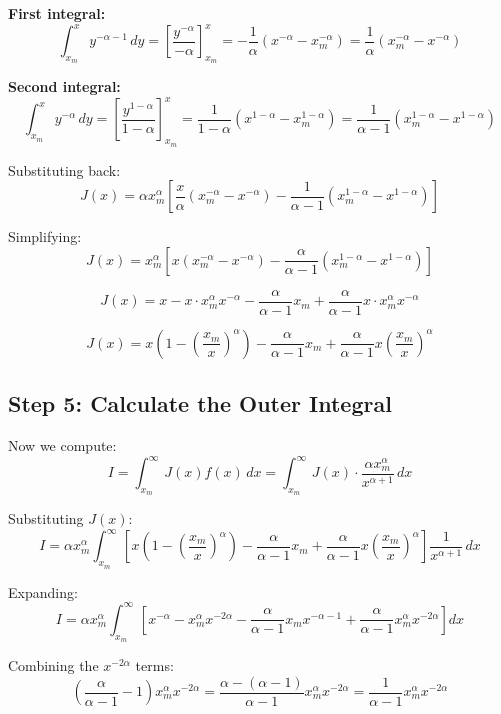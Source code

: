 \documentclass[12pt,a4paper]{article}
\theoremstyle{definition}
\begin{document}
\textbf{First integral:}
\[
\int_{x_m}^x y^{-\alpha-1} \, dy = \left[ \frac{y^{-\alpha}}{-\alpha} \right]_{x_m}^x = -\frac{1}{\alpha}\left(x^{-\alpha} - x_m^{-\alpha}\right) = \frac{1}{\alpha}\left(x_m^{-\alpha} - x^{-\alpha}\right)
\]

\textbf{Second integral:}
\[
\int_{x_m}^x y^{-\alpha} \, dy = \left[ \frac{y^{1-\alpha}}{1-\alpha} \right]_{x_m}^x = \frac{1}{1-\alpha}\left(x^{1-\alpha} - x_m^{1-\alpha}\right) = \frac{1}{\alpha - 1}\left(x_m^{1-\alpha} - x^{1-\alpha}\right)
\]

Substituting back:
\[
J(x) = \alpha x_m^\alpha \left[ \frac{x}{\alpha}\left(x_m^{-\alpha} - x^{-\alpha}\right) - \frac{1}{\alpha - 1}\left(x_m^{1-\alpha} - x^{1-\alpha}\right) \right]
\]

Simplifying:
\[
J(x) = x_m^\alpha \left[ x\left(x_m^{-\alpha} - x^{-\alpha}\right) - \frac{\alpha}{\alpha - 1}\left(x_m^{1-\alpha} - x^{1-\alpha}\right) \right]
\]

\[
J(x) = x - x \cdot x_m^\alpha x^{-\alpha} - \frac{\alpha}{\alpha - 1} x_m + \frac{\alpha}{\alpha - 1} x \cdot x_m^\alpha x^{-\alpha}
\]

\[
J(x) = x\left(1 - \left(\frac{x_m}{x}\right)^\alpha\right) - \frac{\alpha}{\alpha - 1} x_m + \frac{\alpha}{\alpha - 1} x\left(\frac{x_m}{x}\right)^\alpha
\]

\subsection{Step 5: Calculate the Outer Integral}

Now we compute:
\[
I = \int_{x_m}^\infty J(x) f(x) \, dx = \int_{x_m}^\infty J(x) \cdot \frac{\alpha x_m^\alpha}{x^{\alpha+1}} \, dx
\]

Substituting $J(x)$:
\[
I = \alpha x_m^\alpha \int_{x_m}^\infty \left[ x\left(1 - \left(\frac{x_m}{x}\right)^\alpha\right) - \frac{\alpha}{\alpha - 1} x_m + \frac{\alpha}{\alpha - 1} x\left(\frac{x_m}{x}\right)^\alpha \right] \frac{1}{x^{\alpha+1}} \, dx
\]

Expanding:
\[
I = \alpha x_m^\alpha \int_{x_m}^\infty \left[ x^{-\alpha} - x_m^\alpha x^{-2\alpha} - \frac{\alpha}{\alpha - 1} x_m x^{-\alpha-1} + \frac{\alpha}{\alpha - 1} x_m^\alpha x^{-2\alpha} \right] dx
\]

Combining the $x^{-2\alpha}$ terms:
\[
\left(\frac{\alpha}{\alpha - 1} - 1\right) x_m^\alpha x^{-2\alpha} = \frac{\alpha - (\alpha - 1)}{\alpha - 1} x_m^\alpha x^{-2\alpha} = \frac{1}{\alpha - 1} x_m^\alpha x^{-2\alpha}
\]
\end{document}
